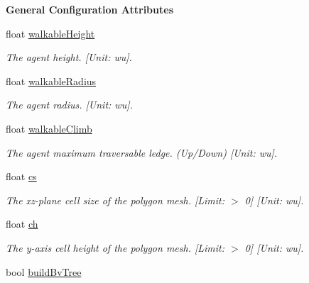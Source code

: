 \begin{Indent}\textbf{ General Configuration Attributes}\par
\begin{DoxyCompactItemize}
\item 
\mbox{\label{structdtNavMeshCreateParams_a1d7c8d3ae651371b0ce5acbc19f9221e}} 
float \hyperlink{structdtNavMeshCreateParams_a1d7c8d3ae651371b0ce5acbc19f9221e}{walkable\+Height}
\begin{DoxyCompactList}\small\item\em The agent height. \mbox{[}Unit\+: wu\mbox{]}. \end{DoxyCompactList}\item 
\mbox{\label{structdtNavMeshCreateParams_a5c467f6297663e0ed82c49d768bc3b12}} 
float \hyperlink{structdtNavMeshCreateParams_a5c467f6297663e0ed82c49d768bc3b12}{walkable\+Radius}
\begin{DoxyCompactList}\small\item\em The agent radius. \mbox{[}Unit\+: wu\mbox{]}. \end{DoxyCompactList}\item 
\mbox{\label{structdtNavMeshCreateParams_a2ccf071ca70fe5566ddd2f214bac7779}} 
float \hyperlink{structdtNavMeshCreateParams_a2ccf071ca70fe5566ddd2f214bac7779}{walkable\+Climb}
\begin{DoxyCompactList}\small\item\em The agent maximum traversable ledge. (Up/\+Down) \mbox{[}Unit\+: wu\mbox{]}. \end{DoxyCompactList}\item 
\mbox{\label{structdtNavMeshCreateParams_a2297125898dd39b19c515638d31cacfc}} 
float \hyperlink{structdtNavMeshCreateParams_a2297125898dd39b19c515638d31cacfc}{cs}
\begin{DoxyCompactList}\small\item\em The xz-\/plane cell size of the polygon mesh. \mbox{[}Limit\+: $>$ 0\mbox{]} \mbox{[}Unit\+: wu\mbox{]}. \end{DoxyCompactList}\item 
\mbox{\label{structdtNavMeshCreateParams_aabc87cedcd783bdd16b8b4377fdb8ccf}} 
float \hyperlink{structdtNavMeshCreateParams_aabc87cedcd783bdd16b8b4377fdb8ccf}{ch}
\begin{DoxyCompactList}\small\item\em The y-\/axis cell height of the polygon mesh. \mbox{[}Limit\+: $>$ 0\mbox{]} \mbox{[}Unit\+: wu\mbox{]}. \end{DoxyCompactList}\item 
bool \hyperlink{structdtNavMeshCreateParams_a3c0dab8176f42294bd87c07a4fcce519}{build\+Bv\+Tree}
\end{DoxyCompactItemize}
\end{Indent}


